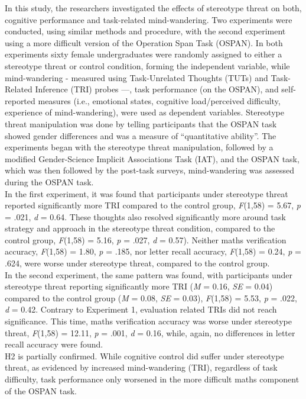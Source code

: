 \documentclass[
  stu,floatsintext]{apa7}
\begin{document}
In this study, the researchers investigated the effects of stereotype threat on both, cognitive performance and task-related mind-wandering.
Two experiments were conducted, using similar methods and procedure, with the second experiment using a more difficult version of the Operation Span Task (OSPAN).
In both experiments sixty female undergraduates were randomly assigned to either a stereotype threat or control condition, forming the independent variable, while mind-wandering - measured using Task-Unrelated Thoughts (TUTs) and Task-Related Inference (TRI) probes ---, task performance (on the OSPAN), and self-reported measures (i.e., emotional states, cognitive load/perceived difficulty, experience of mind-wandering), were used as dependent variables.
Stereotype threat manipulation was done by telling participants that the OSPAN task showed gender differences and was a measure of ``quantitative ability''.
The experiments began with the stereotype threat manipulation, followed by a modified Gender-Science Implicit Associations Task (IAT), and the OSPAN task, which was then followed by the post-task surveys, mind-wandering was assessed during the OSPAN task.\\
In the first experiment, it was found that participants under stereotype threat reported significantly more TRI compared to the control group, \emph{F}(1,58) = 5.67, \emph{p} = .021, \emph{d} = 0.64.
These thoughts also resolved significantly more around task strategy and approach in the stereotype threat condition, compared to the control group, \emph{F}(1,58) = 5.16, \emph{p} = .027, \emph{d} = 0.57).
Neither maths verification accuracy, \emph{F}(1,58) = 1.80, \emph{p} = .185, nor letter recall accuracy, \emph{F}(1,58) = 0.24, \emph{p} = .624, were worse under stereotype threat, compared to the control group.\\
In the second experiment, the same pattern was found, with participants under stereotype threat reporting significantly more TRI (\emph{M} = 0.16, \emph{SE} = 0.04) compared to the control group (\emph{M} = 0.08, \emph{SE} = 0.03), \emph{F}(1,58) = 5.53, \emph{p} = .022, \emph{d} = 0.42.
Contrary to Experiment 1, evaluation related TRIs did not reach significance.
This time, maths verification accuracy was worse under stereotype threat, \emph{F}(1,58) = 12.11, \emph{p} = .001, \emph{d} = 0.16, while, again, no differences in letter recall accuracy were found.\\
H2 is partially confirmed. While cognitive control did suffer under stereotype threat, as evidenced by increased mind-wandering (TRI), regardless of task difficulty, task performance only worsened in the more difficult maths component of the OSPAN task.
\end{document}
